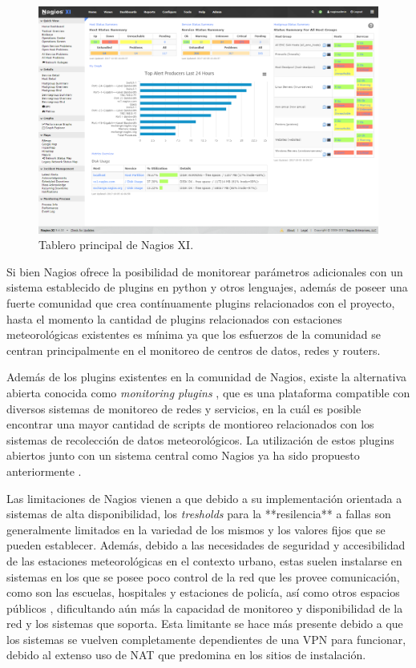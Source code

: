 \begin{figure}[!ht]
	\centering
	\includegraphics[width=.80\linewidth]{images/Nagios_home_dashboard.png}
	\caption{Tablero principal de Nagios XI.}
	\label{fig:nagios_dashboard}
\end{figure}

Si bien Nagios ofrece la posibilidad de monitorear parámetros adicionales con un sistema establecido de plugins en python y otros lenguajes, además de poseer una fuerte comunidad que crea contínuamente plugins relacionados con el proyecto, hasta el momento la cantidad de plugins relacionados con estaciones meteorológicas existentes es mínima ya que los esfuerzos de la comunidad se centran principalmente en el monitoreo de centros de datos, redes y routers.

Además de los plugins existentes en la comunidad de Nagios, existe la alternativa abierta conocida como \textit{monitoring plugins} \cite{monitoring_plugins}, que es una plataforma compatible con diversos sistemas de monitoreo de redes y servicios, en la cuál es posible encontrar una mayor cantidad de scripts de montioreo relacionados con los sistemas de recolección de datos meteorológicos. La utilización de estos plugins abiertos junto con un sistema central como Nagios ya ha sido propuesto anteriormente \cite{monitoreo_raspberry_nagios}.

Las limitaciones de Nagios vienen a que debido a su implementación orientada a sistemas de alta disponibilidad, los \textit{tresholds} para la **resilencia** a fallas son generalmente limitados en la variedad de los mismos y los valores fijos que se pueden establecer. Además, debido a las necesidades de seguridad y accesibilidad de las estaciones meteorológicas en el contexto urbano, estas suelen instalarse en sistemas en los que se posee poco control de la red que les provee comunicación, como son las escuelas, hospitales y estaciones de policía, así como otros espacios públicos \cite{muller_sensors_and_the_city}, dificultando aún más la capacidad de monitoreo y disponibilidad de la red y los sistemas que soporta. Esta limitante se hace más presente debido a que los sistemas se vuelven completamente dependientes de una VPN para funcionar, debido al extenso uso de NAT que predomina en los sitios de instalación.

